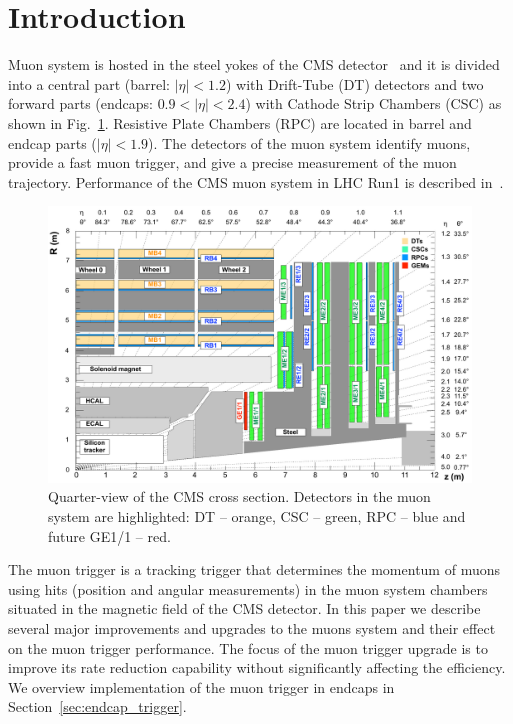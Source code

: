 \section{Introduction}

Muon system is hosted in the steel yokes of the CMS detector~\cite{Chatrchyan:2008aa} and it is divided into a central part (barrel: $|\eta| < 1.2$) with Drift-Tube (DT) detectors and two forward parts (endcaps: $0.9 < |\eta| < 2.4$) with Cathode Strip Chambers (CSC) as shown in Fig.~\ref{fig:CMS_muon_system}. Resistive Plate Chambers (RPC) are located in barrel and endcap parts ($|\eta| < 1.9$). The detectors of the muon system identify muons, provide a fast muon trigger, and give a precise measurement of the muon trajectory. Performance of the CMS muon system in LHC Run1 is described in~\cite{Chatrchyan:2013sba}.

\begin{figure}[b]
        \begin{center}
                \includegraphics[width=0.99\linewidth]{figures/cms_upg_o_g_b_ni_ge11_r_grid_130919.pdf}
                \caption{Quarter-view of the CMS cross section. Detectors in the muon system are highlighted: DT -- orange, CSC -- green, RPC -- blue and future GE1/1 -- red.}
                \label{fig:CMS_muon_system}
        \end{center}
\end{figure}

The muon trigger is a tracking trigger that determines the momentum of muons using hits (position and angular measurements) in the muon system chambers situated in the magnetic field of the CMS detector. In this paper we describe several major improvements and upgrades to the muons system and their effect on the muon trigger performance. The focus of the muon trigger upgrade is to improve its rate reduction capability without significantly affecting the efficiency. We overview implementation of the muon trigger in endcaps in Section~\ref{sec:endcap_trigger}.

